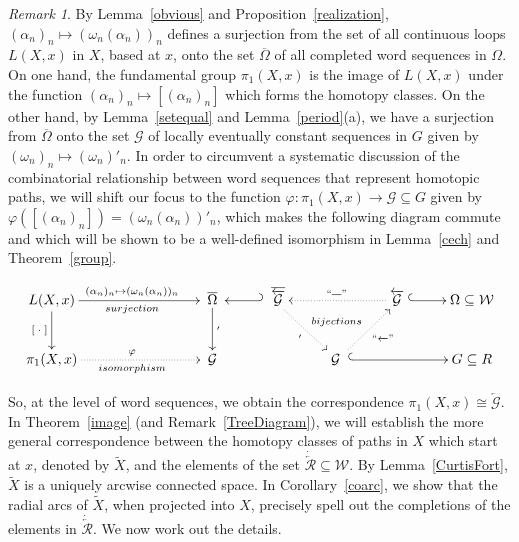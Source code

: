 \documentclass{amsart}
\theoremstyle{definition}
\theoremstyle{remark}
\newtheorem{remark}[theorem]{Remark}
\numberwithin{equation}{section}
\begin{document}
\begin{remark}\label{GroupDiagram}
By Lemma~\ref{obvious} and Proposition~\ref{realization},  $(\alpha_n)_n\mapsto (\omega_n(\alpha_n))_n$ defines a surjection from the set of all continuous loops $L(X,x)$ in $X$, based at $x$, onto the set $\overline{\Omega}$ of all completed word sequences in $\Omega$.
On one hand, the fundamental group $\pi_1(X,x)$ is the image of $L(X,x)$ under the function $(\alpha_n)_n\mapsto [(\alpha_n)_n]$ which forms the homotopy classes. On the other hand, by Lemma~\ref{setequal} and Lemma~\ref{period}(a), we have a surjection from $\overline{\Omega}$ onto the set
$\mathcal G$ of locally eventually constant sequences in $G$ given by $(\omega_n)_n\mapsto (\omega_n)'_n$. In order to circumvent a systematic discussion of the combinatorial relationship between word sequences that represent homotopic paths, we will shift our focus to the function $\varphi:\pi_1(X,x)\rightarrow \mathcal G\subseteq G$ given by $\varphi([(\alpha_n)_n])=(\omega_n(\alpha_n))'_n$, which makes the following diagram commute and which will be shown to be a well-defined isomorphism in Lemma~\ref{cech} and Theorem~\ref{group}.

\hspace{-18pt} \parbox{8in}{
\[
\xymatrix{
L(X,x) \ar[d]_{[\;\cdot\;]}   \ar[rrr]_{surjection}^{(\alpha_n)_n\mapsto(\omega_n(\alpha_n))_n} &&&  \;\overline{\Omega}\;  \ar[d]^{'} & \;\; \overline{\overleftarrow{\mathcal G}} \ar@{_{(}->}[l] \ar@{.>}[dr]_{'}^{\; bijections} &&  \overleftarrow{\mathcal G}\; \ar@{.>}_{``\overline{\;\;\;}"}[ll] \ar@{^{(}->}[r] &\Omega\subseteq  {\mathcal W}\\
\pi_1(X,x) \ar@{.>}[rrr]^{\varphi}_{isomorphism} &&& \; {\mathcal G} \;  & & \; {\mathcal G} \;\;\ar@{^{(}->}[rr] \ar@{.>}_{``\overleftarrow{\;\;\;}"}[ur] & & G\subseteq R}
\]}
So, at the level of word sequences, we obtain the correspondence  $\pi_1(X,x)\cong \overleftarrow{\mathcal G}$.
 In Theorem~\ref{image} (and Remark~\ref{TreeDiagram}), we will establish the more general correspondence between the homotopy classes of paths in $X$ which start at $x$, denoted by $\tilde{X}$, and the elements of the set $\dot{\overleftarrow{\mathcal R}}\subseteq {\mathcal W}$.
 By Lemma~\ref{CurtisFort}, $\tilde{X}$ is a uniquely arcwise connected space. In Corollary~\ref{coarc}, we  show that the radial arcs of $\tilde{X}$, when projected into $X$, precisely spell out the completions of the elements in $\dot{\overleftarrow{\mathcal R}}$. We now work out the details.
\end{remark}
\end{document}
